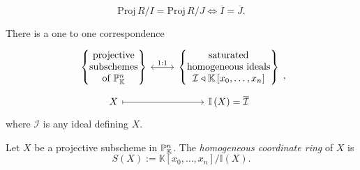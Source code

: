  \begin{lem}
 	\begin{equation}
 	\mathrm{Proj}\, R/I = \mathrm{Proj}\, R/J \iff
	\overline{I} = \overline{J}
 	.\end{equation} 
 \end{lem} 

 \begin{thm}[]
 	There is a one to one correspondence
	\begin{equation}
	\begin{tikzcd}[row sep=tiny]
		\left\{ 
		\begin{matrix}
			\text{projective}\\
			\text{subschemes}\\
			\text{of } \mathbb{P}^{n}_{\K}
		\end{matrix} 
		\right\} \arrow[r, "1:1", leftrightarrow] &
		\left\{ 
		\begin{matrix}
			\text{saturated}\\
			\text{homogeneous ideals}\\
			\mathcal{I} \triangleleft \mathbb{K}\left[x_0, \ldots, x_n \right]
		\end{matrix} 
		\right\}\\
		X \arrow[r, "", mapsto] &
		\mathbb{I}\left( X \right) = \overline{\mathcal{I}}
	\end{tikzcd}
	,\end{equation} 
	where $\mathcal{I}$ is any ideal defining $X$.
 \end{thm}

 \begin{defn}
 	Let $X$ be a projective subscheme in $\mathbb{P}^{n}_{\mathbb{K}}$.
	The {\em homogeneous coordinate ring} of $X$ is
	\begin{equation}
		S(X) := \mathbb{K}\left[x_0, \ldots, x_n \right] / \mathbb{I}\left( X \right)
	.\end{equation} 
 \end{defn}
 
